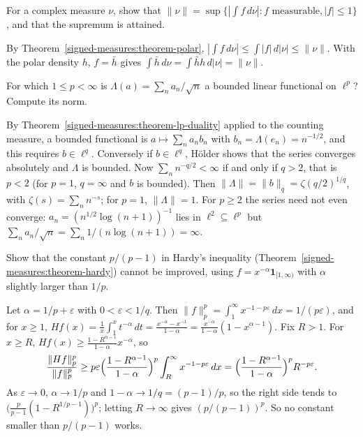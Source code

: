 \begin{exercise}\label{signed-measures:exercise-norm-formula}
For a complex measure $\nu$, show that $\|\nu\| = \sup\{|\int f\,d\nu| : f \text{ measurable}, |f| \leq 1\}$, and that the supremum is attained.
\end{exercise}

\begin{solution}
By Theorem~\ref{signed-measures:theorem-polar}, $|\int f\,d\nu| \leq \int|f|\,d|\nu| \leq \|\nu\|$. With the polar density $h$, $f = \bar h$ gives $\int\bar h\,d\nu = \int\bar hh\,d|\nu| = \|\nu\|$.
\end{solution}

\begin{exercise}\label{signed-measures:exercise-sequence-functional}
For which $1 \leq p < \infty$ is $\Lambda(a) = \sum_na_n/\sqrt n$ a bounded linear functional on $\ell^p$? Compute its norm.
\end{exercise}

\begin{solution}
By Theorem~\ref{signed-measures:theorem-lp-duality} applied to the counting measure, a bounded functional is $a \mapsto \sum_na_nb_n$ with $b_n = \Lambda(e_n) = n^{-1/2}$, and this requires
$b \in \ell^q$. Conversely if $b \in \ell^q$, H\"older shows that the series converges absolutely and $\Lambda$ is bounded. Now $\sum_nn^{-q/2} < \infty$ if and only if $q > 2$, that is $p < 2$ (for
$p = 1$, $q = \infty$ and $b$ is bounded). Then $\|\Lambda\| = \|b\|_q = \zeta(q/2)^{1/q}$, with $\zeta(s) = \sum_nn^{-s}$; for $p = 1$, $\|\Lambda\| = 1$. For $p \geq 2$ the series need not even
converge: $a_n = (n^{1/2}\log(n + 1))^{-1}$ lies in $\ell^2 \subseteq \ell^p$ but $\sum_na_n/\sqrt n = \sum_n1/(n\log(n + 1)) = \infty$.
\end{solution}

\begin{exercise}\label{signed-measures:exercise-hardy-sharp}
Show that the constant $p/(p - 1)$ in Hardy's inequality (Theorem~\ref{signed-measures:theorem-hardy}) cannot be improved, using $f = x^{-\alpha}\mathbf{1}_{[1, \infty)}$ with $\alpha$ slightly larger than
$1/p$.
\end{exercise}

\begin{solution}
Let $\alpha = 1/p + \varepsilon$ with $0 < \varepsilon < 1/q$. Then $\|f\|_p^p = \int_1^\infty x^{-1 - p\varepsilon}\,dx = 1/(p\varepsilon)$, and for $x \geq 1$,
$Hf(x) = \frac1x\int_1^xt^{-\alpha}\,dt = \frac{x^{-\alpha} - x^{-1}}{1 - \alpha} = \frac{x^{-\alpha}}{1 - \alpha}(1 - x^{\alpha - 1})$. Fix $R > 1$. For $x \geq R$, $Hf(x) \geq \frac{1 - R^{\alpha - 1}}{1 - \alpha}x^{-\alpha}$,
so
\[
\frac{\|Hf\|_p^p}{\|f\|_p^p} \geq p\varepsilon\Bigl(\frac{1 - R^{\alpha - 1}}{1 - \alpha}\Bigr)^p\int_R^\infty x^{-1 - p\varepsilon}\,dx = \Bigl(\frac{1 - R^{\alpha - 1}}{1 - \alpha}\Bigr)^pR^{-p\varepsilon} .
\]
As $\varepsilon \to 0$, $\alpha \to 1/p$ and $1 - \alpha \to 1/q = (p - 1)/p$, so the right side tends to $\bigl(\frac{p}{p - 1}(1 - R^{1/p - 1})\bigr)^p$; letting $R \to \infty$ gives
$(p/(p - 1))^p$. So no constant smaller than $p/(p - 1)$ works.
\end{solution}

